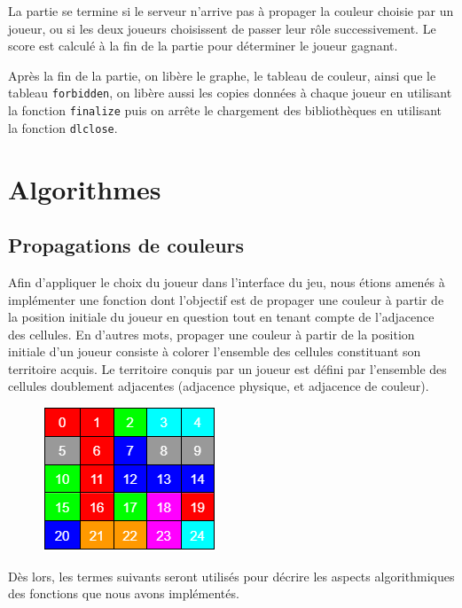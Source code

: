 \documentclass[11pt]{article}
\begin{document}
La partie se termine si le serveur n'arrive pas à propager la couleur choisie par un joueur, ou si les deux joueurs choisissent de passer leur rôle successivement. Le score est calculé à la fin de la partie pour déterminer le joueur gagnant.\\
\par


Après la fin de la partie, on libère le graphe, le tableau de couleur, ainsi que le tableau \texttt{forbidden}, on libère aussi les copies données à chaque joueur en utilisant la fonction \texttt{finalize} puis on arrête le chargement des bibliothèques en utilisant la fonction \texttt{dlclose}. 
\section{Algorithmes}
\subsection{Propagations de couleurs}
Afin d'appliquer le choix du joueur dans l'interface du jeu, nous étions amenés à implémenter une fonction dont l'objectif est de propager une couleur à partir de la position initiale du joueur en question tout en tenant compte de l'adjacence des cellules. En d'autres mots, propager une couleur à partir de la position initiale d'un joueur consiste à colorer l'ensemble des cellules constituant son territoire acquis. Le territoire conquis par un joueur est défini par l'ensemble des cellules doublement adjacentes (adjacence physique, et adjacence de couleur). 
\begin{figure}[h]
    \begin{center}
        \includegraphics[scale=0.8]{./img/spread0.PNG}
    \end{center}
\end{figure}
Dès lors, les termes suivants seront utilisés pour décrire les aspects algorithmiques des fonctions que nous avons implémentés.
\end{document}
